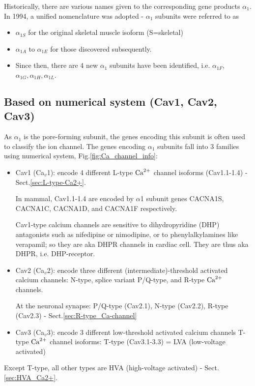 Historically, there are various names given to the corresponding gene products
$\alpha_1$. In 1994, a unified nomenclature was adopted - $\alpha_1$ subunits
were referred to as 
\begin{itemize}
  \item  $\alpha_{1S}$ for the original skeletal muscle isoform (S=skeletal) 

  \item $\alpha_{1A}$ to $\alpha_{1E}$ for those discovered subsequently.
%     
  
  \item  Since then, there are 4 new $\alpha_1$ subunits have been identified,
  i.e. $\alpha_{1F}$, $\alpha_{1G}, \alpha_{1H}, \alpha_{1L}$.
  
\end{itemize}


\subsection{Based on numerical system (Cav1, Cav2, Cav3)}
\label{sec:Cav1.x}
\label{sec:Cav2.x}
\label{sec:Cav3.x}

As $\alpha_1$ is the pore-forming subunit, the genes encoding this subunit is
often used to classify the ion channel. The genes encoding $\alpha_1$ subunits
fall into 3 families using numerical system, Fig.\ref{fig:Ca_channel_info}:
\begin{itemize}
  \item Cav1 (Ca$_v$1): encode 4 different L-type ${\text{Ca}^{2+}}$ channel isoforms
  (Cav1.1-1.4) - Sect.\ref{sec:L-type-Ca2+}.
  
  In mammal, Cav1.1-1.4 are encoded by $\alpha$1 subunit genes CACNA1S, CACNA1C,
  CACNA1D, and CACNA1F respectively. 
  
  Cav1-type calcium channels are sensitive to dihydropyridine (DHP) antagonists
  such as nifedipine or nimodipine, or to phenylalkylamines like verapamil; so
  they are aka DHPR channels in cardiac cell. They are thus aka DHPR, i.e.
  DHP-receptor.
  
  \item Cav2 (Ca$_v$2): encode three different (intermediate)-threshold
  activated calcium channels:  N-type, splice variant P/Q-type, and R-type ${\text{Ca}^{2+}}$
  channels.
  
  At the neuronal synapse: P/Q-type (Cav2.1), N-type (Cav2.2), R-type (Cav2.3) -
  Sect.\ref{sec:R-type_Ca-channel}
  
  \item Cav3 (Ca$_v$3): encode 3 different low-threshold activated calcium
  channels T-type ${\text{Ca}^{2+}}$ channel isoforms: T-type (Cav3.1-3.3) = LVA
  (low-voltage activated)
  
\end{itemize}
Except T-type, all other types are HVA (high-voltage activated) -
Sect.\ref{sec:HVA_Ca2+}.


